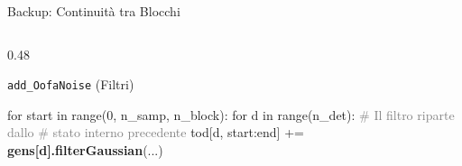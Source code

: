 \documentclass[10pt, aspectratio=169, handout]{beamer}
\begin{document}
\begin{frame}[fragile]{Backup: Continuità tra Blocchi}
\begin{columns}[T]
\begin{column}{0.48\textwidth}
\begin{block}{\texttt{add\_OofaNoise} (Filtri)}
\begin{semiverbatim}
for start in range(0, n_samp, n_block):
    for d in range(n_det):
        \textcolor{gray}{# Il filtro riparte dallo}
        \textcolor{gray}{# stato interno precedente}
        tod[d, start:end] += \\
           \textcolor{orange!80!black}{\textbf{gens[d].filterGaussian}}(...)
        \end{semiverbatim}
        \centering
      \end{block}
    \end{column}
  \end{columns}

\end{frame}
\end{document}

